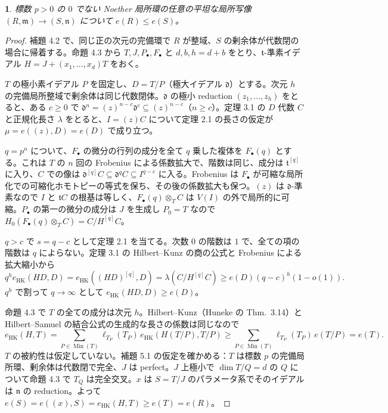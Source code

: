 \documentclass[11pt,a4paper]{ltjsarticle}
\newcommand{\stmtname}{}
\theoremstyle{plain}
\newtheorem*{stmtgen}{\stmtname}
\newenvironment{stmt}[1]{\renewcommand{\stmtname}{#1}\begin{stmtgen}}{\end{stmtgen}}
\theoremstyle{definition}
\newcommand{\m}{\mathfrak{m}}
\newcommand{\n}{\mathfrak{n}}
\newcommand{\dd}{\mathfrak{d}}
\newcommand{\tf}{\mathfrak{t}}
\newcommand{\Min}{\operatorname{Min}}
\newcommand{\eHK}{e_{\mathrm{HK}}}
\begin{document}
\begin{stmt}{定理 5.2}
標数 $p>0$ の $0$ でない Noether 局所環の任意の平坦な局所写像 $(R,\m)\to(S,\n)$ について $e(R)\le e(S)$。
\end{stmt}
\begin{proof}
補題 4.2 で、同じ正の次元の完備環で $R$ が整域、$S$ の剰余体が代数閉の場合に帰着する。命題 4.3 から $T,J,P_\bullet,F_\bullet$ と $d,b,h = d+b$ をとり、$\tf$-準素イデアル $H = J+(x_1,\dots,x_d)T$ をおく。

$T$ の極小素イデアル $P$ を固定し、$D = T/P$（極大イデアル $\dd$）とする。次元 $h$ の完備局所整域で剰余体は同じ代数閉体。$\dd$ の極小 reduction $(z_1,\dots,z_h)$ をとると、ある $c\ge0$ で $\dd^n = (z)^{n-c}\dd^c\subseteq(z)^{n-c}$（$n\ge c$）。定理 3.1 の $D$ 代数 $C$ と正規化長さ $\lambda$ をとると、$I = (z)C$ について定理 2.1 の長さの仮定が $\mu = e((z),D) = e(D)$ で成り立つ。

$q = p^n$ について、$F_\bullet$ の微分の行列の成分を全て $q$ 乗した複体を $F_\bullet(q)$ とする。これは $T$ の $n$ 回の Frobenius による係数拡大で、階数は同じ、成分は $\tf^{[q]}$ に入り、$C$ での像は $\dd^{[q]}C\subseteq\dd^qC\subseteq I^{q-c}$ に入る。Frobenius は $F_\bullet$ が可縮な局所化での可縮化ホモトピーの等式を保ち、その後の係数拡大も保つ。$(z)$ は $\dd$-準素なので $I$ と $\tf C$ の根基は等しく、$F_\bullet(q)\otimes_TC$ は $V(I)$ の外で局所的に可縮。$P_\bullet$ の第一の微分の成分は $J$ を生成し $P_0 = T$ なので $H_0(F_\bullet(q)\otimes_TC) = C/H^{[q]}C$。

$q>c$ で $s = q-c$ として定理 2.1 を当てる。次数 $0$ の階数は $1$ で、全ての項の階数は $q$ によらない。定理 3.1 の Hilbert--Kunz の商の公式と Frobenius による拡大縮小から
\[
  q^h\eHK(HD,D) = \eHK((HD)^{[q]},D) = \lambda(C/H^{[q]}C)\ge e(D)(q-c)^h(1-o(1)).
\]
$q^h$ で割って $q\to\infty$ として $\eHK(HD,D)\ge e(D)$。

命題 4.3 で $T$ の全ての成分は次元 $h$。Hilbert--Kunz（Huneke の Thm.~3.14）と Hilbert--Samuel の結合公式の生成的な長さの係数は同じなので
\[
  \eHK(H,T) = \sum_{P\in\Min(T)}\ell_{T_P}(T_P)\,\eHK(H(T/P),T/P)\ge\sum_{P\in\Min(T)}\ell_{T_P}(T_P)\,e(T/P) = e(T).
\]
$T$ の被約性は仮定していない。補題 5.1 の仮定を確かめる：$T$ は標数 $p$ の完備局所環、剰余体は代数閉で完全、$J$ は perfect。$J$ 上極小で $\dim T/Q = d$ の $Q$ について命題 4.3 で $T_Q$ は完全交叉。$x$ は $S = T/J$ のパラメータ系でそのイデアルは $\n$ の reduction。よって
$e(S) = e((x),S) = \eHK(H,T)\ge e(T) = e(R)$。
\end{proof}

\end{document}
